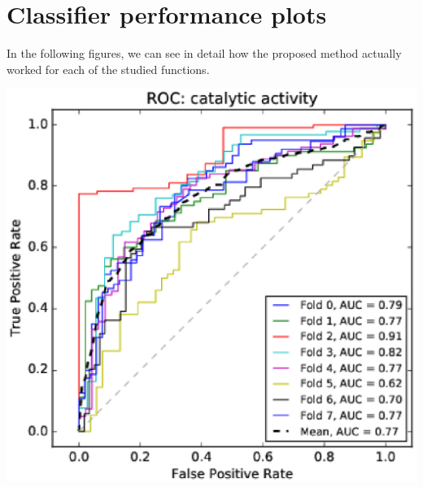 \documentclass[11pt,twoside,a4paper]{book}
\newenvironment{Figure}
  {\par\medskip\noindent\minipage{\linewidth}}
  {\endminipage\par\medskip}
\begin{document}
\section{Classifier performance plots}
In the following figures,
we can see in detail how the proposed method actually worked for each of the studied functions.
\begin{multicols}{2}
\begin{Figure}\begin{center}\includegraphics[width=\linewidth]{figures/roc_catalytic_activity}\label{fig:roc_catalytic_activity}\end{center}\end{Figure}

\end{multicols}
\end{document}
